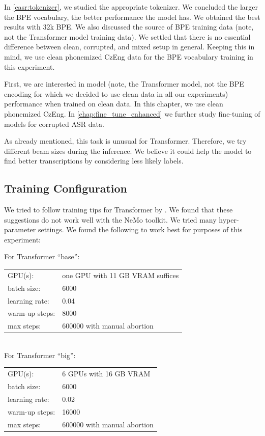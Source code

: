 In \cref{easr:tokenizer}, we studied the appropriate tokenizer. We concluded the larger the BPE vocabulary, the better performance the model has. We obtained the best results with 32k BPE. We also discussed the source of BPE training data (note, not the Transformer model training data). We settled that there is no essential difference between clean, corrupted, and mixed setup in general. Keeping this in mind, we use clean phonemized CzEng data for the BPE vocabulary training in this experiment. 

First, we are interested in model (note, the Transformer model, not the BPE encoding for which we decided to use clean data in all our experiments) performance when trained on clean data. In this chapter, we use clean phonemized CzEng. In \cref{chap:fine_tune_enhanced} we further study fine-tuning of models for corrupted ASR data.

As already mentioned, this task is unusual for Transformer. Therefore, we try different beam sizes during the inference. We believe it could help the model to find better transcriptions by considering less likely labels.

\subsection{Training Configuration}
\label{easr:training}
We tried to follow training tips for Transformer by . We found that these suggestions do not work well with the NeMo toolkit. We tried many hyper-parameter settings. We found the following to work best for purposes of this experiment:

\noindent For Transformer ``base'':\\

\begin{tabular}{ll}
	GPU(s): & one GPU with 11 GB VRAM suffices\\
	batch size:&  6000\\
	learning rate:&  0.04\\
	warm-up steps:&  8000\\
	max steps:&  600000 with manual abortion\\
\end{tabular}\\

\noindent For Transformer ``big'':\\

\begin{tabular}{ll}
	GPU(s): & 6 GPUs with 16 GB VRAM\\
	batch size:&  6000\\
	learning rate:&  0.02\\
	warm-up steps:&  16000\\
	max steps:&  600000 with manual abortion\\
\end{tabular}\\

